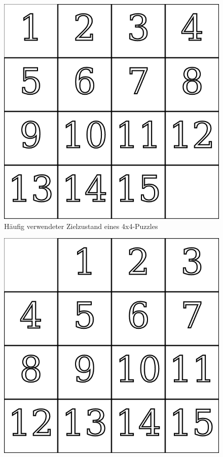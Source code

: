 %
\begin{minipage}{\linewidth}
	\begin{minipage}[t]{0.45\linewidth}
		\begin{figure}[H]
			\centering
			\includegraphics[width=\linewidth,keepaspectratio]{img/End_Puzzle_AO.png}
			\captionsetup{format=plain, indention=0pt}
			\caption{Häufig verwendeter Zielzustand eines 4x4-Puzzles \label{fig:Perm_puzzle_end_allOther}}
		\end{figure}
	\end{minipage}
	\hfill
	\begin{minipage}[t]{0.45\linewidth}
		\begin{figure}[H]
			\centering
			\includegraphics[width=\linewidth,keepaspectratio]{img/End_Puzzle_Stroetmann.png}

\end{figure}
\end{minipage}
\end{minipage}
